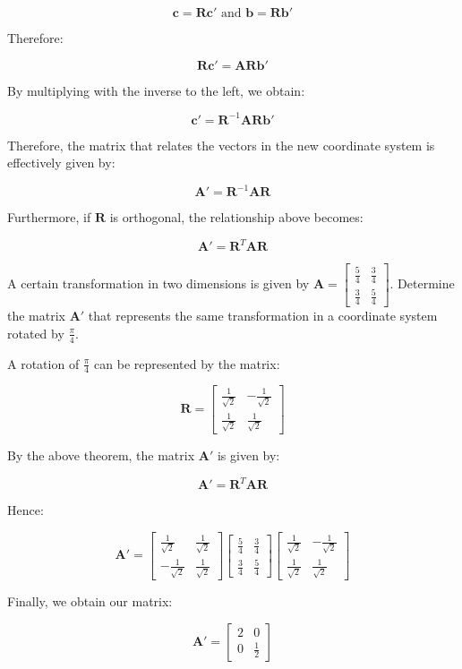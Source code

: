\documentclass[12pt]{article}
\begin{document}
\[ \mathbf{c = Rc'} \text{   and   } \mathbf{b = Rb'} \]

Therefore:

\[ \mathbf{Rc' = ARb'} \]

By multiplying with the inverse to the left, we obtain:

\[ \mathbf{c'} = \mathbf{R}^{-1}\mathbf{ARb'} \]

Therefore, the matrix that relates the vectors in the new coordinate system is effectively given by:

\[ \mathbf{A'} = \mathbf{R}^{-1}\mathbf{AR} \]

Furthermore, if $\mathbf{R}$ is orthogonal, the relationship above becomes:

\[ \mathbf{A'} = \mathbf{R}^T\mathbf{AR} \]

\begin{example}
    A certain transformation in two dimensions is given by $\mathbf{A} = \begin{bmatrix}
        \frac{5}{4} & \frac{3}{4} \\
        \frac{3}{4} & \frac{5}{4}
    \end{bmatrix}$. Determine the matrix $\mathbf{A'}$ that represents the same transformation in a coordinate system rotated by $\frac{\pi}{4}$.

    A rotation of $\frac{\pi}{4}$ can be represented by the matrix:

    \[ \mathbf{R} = \begin{bmatrix}
        \frac{1}{\sqrt{2}} & -\frac{1}{\sqrt{2}} \\
        \frac{1}{\sqrt{2}} & \frac{1}{\sqrt{2}}
    \end{bmatrix} \]

    By the above theorem, the matrix $\mathbf{A'}$ is given by:

    \[ \mathbf{A'} = \mathbf{R}^T\mathbf{AR} \]

    Hence:

    \[ \mathbf{A'} = \begin{bmatrix}
        \frac{1}{\sqrt{2}} & \frac{1}{\sqrt{2}} \\
        -\frac{1}{\sqrt{2}} & \frac{1}{\sqrt{2}}
    \end{bmatrix} \begin{bmatrix}
        \frac{5}{4} & \frac{3}{4} \\
        \frac{3}{4} & \frac{5}{4}
    \end{bmatrix} \begin{bmatrix}
        \frac{1}{\sqrt{2}} & -\frac{1}{\sqrt{2}} \\
        \frac{1}{\sqrt{2}} & \frac{1}{\sqrt{2}}
    \end{bmatrix} \]

    Finally, we obtain our matrix:

    \[ \mathbf{A'} = \begin{bmatrix}
        2 & 0 \\
        0 & \frac{1}{2}
    \end{bmatrix} \]
\end{example}
\end{document}
